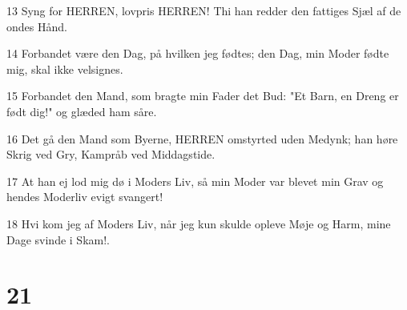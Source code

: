 \par 13 Syng for HERREN, lovpris HERREN! Thi han redder den fattiges Sjæl af de ondes Hånd.
\par 14 Forbandet være den Dag, på hvilken jeg fødtes; den Dag, min Moder fødte mig, skal ikke velsignes.
\par 15 Forbandet den Mand, som bragte min Fader det Bud: "Et Barn, en Dreng er født dig!" og glæded ham såre.
\par 16 Det gå den Mand som Byerne, HERREN omstyrted uden Medynk; han høre Skrig ved Gry, Kampråb ved Middagstide.
\par 17 At han ej lod mig dø i Moders Liv, så min Moder var blevet min Grav og hendes Moderliv evigt svangert!
\par 18 Hvi kom jeg af Moders Liv, når jeg kun skulde opleve Møje og Harm, mine Dage svinde i Skam!.

\chapter{21}

